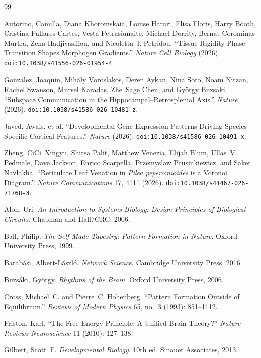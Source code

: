 \documentclass[12pt, a4paper, openany]{book}
\theoremstyle{definition}
\theoremstyle{remark}
\begin{document}
\begin{thebibliography}{99}

Autorino, Camilla, Diana Khoromskaia, Louise Harari, Elisa Floris, Harry Booth,
Cristina Pallares-Cartes, Vesta Petrasiunaite, Michael Dorrity, Bernat
Corominas-Murtra, Zena Hadjivasiliou, and Nicoletta~I. Petridou.
``Tissue Rigidity Phase Transition Shapes Morphogen Gradients.''
\textit{Nature Cell Biology} (2026).
\texttt{doi:10.1038/s41556-026-01954-4}.

Gonzalez, Joaquin, Mih\'{a}ly V\"{o}r\"{o}slakos, Deren Aykan, Nina Soto,
Noam Nitzan, Rachel Swanson, Mursel Karadas, Zhe~Sage Chen, and
Gy\"{o}rgy Buzs\'{a}ki.
``Subspace Communication in the Hippocampal--Retrosplenial Axis.''
\textit{Nature} (2026).
\texttt{doi:10.1038/s41586-026-10481-z}.

Javed, Awais, et al.
``Developmental Gene Expression Patterns Driving Species-Specific Cortical
Features.''
\textit{Nature} (2026).
\texttt{doi:10.1038/s41586-026-10491-x}.

Zheng, CiCi~Xingyu, Shirsa Palit, Matthew Venezia, Elijah Blum,
Ullas~V. Pedmale, Dave Jackson, Enrico Scarpella, Przemyslaw Prusinkiewicz,
and Saket Navlakha.
``Reticulate Leaf Venation in \textit{Pilea peperomioides} is a Voronoi
Diagram.''
\textit{Nature Communications} 17, 4111 (2026).
\texttt{doi:10.1038/s41467-026-71768-3}.

Alon, Uri.
\textit{An Introduction to Systems Biology: Design Principles of Biological
Circuits}.
Chapman and Hall/CRC, 2006.

Ball, Philip.
\textit{The Self-Made Tapestry: Pattern Formation in Nature}.
Oxford University Press, 1999.

Barab\'{a}si, Albert-L\'{a}szl\'{o}.
\textit{Network Science}.
Cambridge University Press, 2016.

Buzs\'{a}ki, Gy\"{o}rgy.
\textit{Rhythms of the Brain}.
Oxford University Press, 2006.

Cross, Michael~C. and Pierre~C. Hohenberg.
``Pattern Formation Outside of Equilibrium.''
\textit{Reviews of Modern Physics} 65, no.~3 (1993): 851--1112.

Friston, Karl.
``The Free-Energy Principle: A Unified Brain Theory?''
\textit{Nature Reviews Neuroscience} 11 (2010): 127--138.

Gilbert, Scott~F.
\textit{Developmental Biology}.
10th ed.
Sinauer Associates, 2013.


\end{thebibliography}
\end{document}
